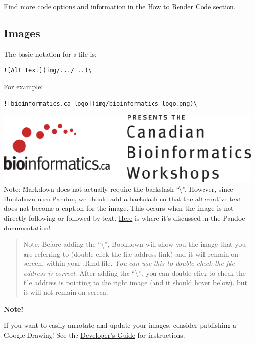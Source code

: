 \documentclass[
]{book}
\newenvironment{bluebox}{
  \definecolor{shadecolor}{RGB}{172, 210, 237}
  \color{white}
  \begin{shaded}}
 {\end{shaded}}
\theoremstyle{definition}
\theoremstyle{definition}
\theoremstyle{definition}
\theoremstyle{definition}
\theoremstyle{remark}
\begin{document}
Find more code options and information in the \hyperref[render-code]{How to Render Code} section.

\subsection*{Images}\label{images}

The basic notation for a file is:

\begin{verbatim}
![Alt Text](img/.../...)\
\end{verbatim}

For example:

\begin{verbatim}
![bioinformatics.ca logo](img/bioinformatics_logo.png)\
\end{verbatim}

\includegraphics{img/bioinformatics_logo.png}\\

Note: Markdown does not actually require the backslash ``\textbackslash{}''. However, since Bookdown uses Pandoc, we should add a backslash so that the alternative text does not become a caption for the image. This occurs when the image is not directly following or followed by text. \href{https://pandoc.org/MANUAL.html\#extension-implicit_figures}{Here} is where it's discussed in the Pandoc documentation!

\begin{quote}
Note: Before adding the ``\textbackslash{}'', Bookdown will show you the image that you are referring to (double-click the file address link) and it will remain on screen, within your .Rmd file. \emph{You can use this to double check the file address is correct.} After adding the ``\textbackslash{}'', you can double-click to check the file address is pointing to the right image (and it should hover below), but it will not remain on screen.
\end{quote}

\begin{bluebox}

\begin{center}
\textbf{Note!}

\end{center}

If you want to easily annotate and update your images, consider publishing a Google Drawing! See the \hyperref[publish-google-draw]{Developer's Guide} for instructions.

\end{bluebox}
\end{document}
